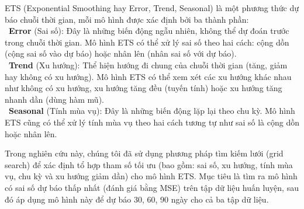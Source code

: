 ETS (Exponential Smoothing hay Error, Trend, Seasonal) là một phương thức dự báo chuỗi thời gian, mỗi mô hình được xác định bởi ba thành phần:\\
\indent\textbullet\ \textbf{Error} (Sai số): Đây là những biến động ngẫu nhiên, không thể dự đoán trước trong chuỗi thời gian. Mô hình ETS có thể xử lý sai số theo hai cách: cộng dồn (cộng sai số vào dự báo) hoặc nhân lên (nhân sai số với dự báo).\\
\indent\textbullet\ \textbf{Trend} (Xu hướng): Thể hiện hướng đi chung của chuỗi thời gian (tăng, giảm hay không có xu hướng). Mô hình ETS có thể xem xét các xu hướng khác nhau như không có xu hướng, xu hướng tăng đều (tuyến tính) hoặc xu hướng tăng nhanh dần (dùng hàm mũ).\\
\indent\textbullet\ \textbf{Seasonal} (Tính mùa vụ): Đây là những biến động lặp lại theo chu kỳ. Mô hình ETS cũng có thể xử lý tính mùa vụ theo hai cách tương tự như sai số là cộng dồn hoặc nhân lên. 

Trong nghiên cứu này, chúng tôi đã sử dụng phương pháp tìm kiếm lưới (grid search) để xác định tổ hợp tham số tối ưu (bao gồm: sai số, xu hướng, tính mùa vụ, chu kỳ và xu hướng giảm dần) cho mô hình ETS. Mục tiêu là tìm ra mô hình có sai số dự báo thấp nhất (đánh giá bằng MSE) trên tập dữ liệu huấn luyện, sau đó áp dụng mô hình này để dự báo 30, 60, 90 ngày cho cả ba tập dữ liệu. 
